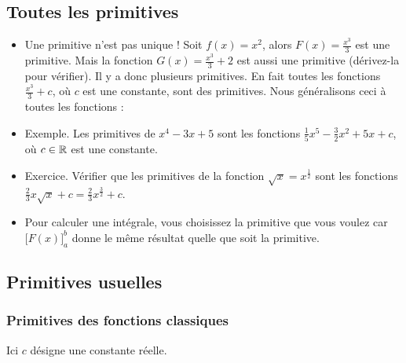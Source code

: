 \documentclass[11pt,class=report,crop=false]{standalone}
\begin{document}
\subsection*{Toutes les primitives}

\begin{itemize}
   \item Une primitive n'est pas unique ! Soit $f(x)=x^2$, alors $F(x)=\displaystyle\frac{x^3}{3}$ est une primitive. Mais la fonction $G(x) = \displaystyle\frac{x^3}{3} + 2$ est aussi une primitive (dérivez-la pour vérifier). Il y a donc plusieurs primitives. En fait toutes les fonctions $\displaystyle\frac{x^3}{3} + c$, où $c$ est une constante, sont des primitives. Nous généralisons ceci à toutes les fonctions :


  \item Exemple. Les primitives de $x^4-3x+5$ sont les fonctions
$\frac{1}{5}x^5 - \frac{3}{2}x^2+5x + c$, où $c\in\mathbb{R}$ est une constante.

  \item Exercice. Vérifier que les primitives de la fonction $\sqrt{x}=x^{\frac12}$ sont les fonctions $\frac23 x\sqrt{x} +c = \frac{2}{3} x^{\frac32} + c$.

  \item Pour calculer une intégrale, vous choisissez la primitive que vous voulez car $\big[F(x)\big]_a^b$ donne le même résultat quelle que soit la primitive.
\end{itemize}




\subsection*{Primitives usuelles}


\subsubsection*{Primitives des fonctions classiques}

Ici $c$ désigne une constante réelle.
\end{document}
